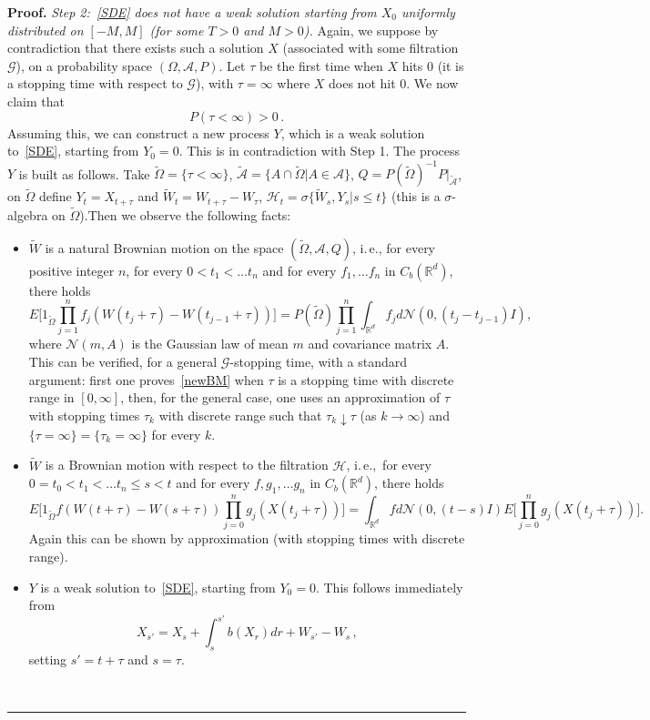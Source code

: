 \documentclass[a4paper,10pt]{article}
\newenvironment{proof}[1][Proof]{\noindent\textbf{#1.} }{\ \rule{0.5em}{0.5em}}
\newcommand{\mr}{\mathbb{R}}
\newcommand{\mc}{\mathcal}
\newcommand{\td}{\tilde}
\begin{document}
\begin{proof}
\emph{Step 2:~\eqref{SDE} does not have a weak solution starting from $X_0$ uniformly distributed on $[-M,M]$ (for some $T>0$ and $M>0$).} Again, we suppose by contradiction that there exists such a solution $X$ (associated with some filtration $\mc{G}$), on a probability space $(\Omega,\mc{A},P)$. Let $\tau$ be the first time when $X$ hits $0$ (it is a stopping time with respect to $\mc{G}$), with $\tau=\infty$ where $X$ does not hit $0$. We now claim that
\begin{equation}
P(\tau<\infty)>0 \, .\label{claim'}
\end{equation}
Assuming this, we can construct a new process $Y$, which is a weak solution to~\eqref{SDE}, starting from $Y_0=0$. This is in contradiction with Step 1. The process $Y$ is built as follows. Take $\td{\Omega}=\{\tau<\infty\}$, $\td{\mc{A}}=\{A\cap\td{\Omega}|A\in\mc{A}\}$, 
$Q= P(\td{\Omega})^{-1} P|_{\td{\mc{A}}}$, on $\td{\Omega}$ define $Y_t=X_{t+\tau}$ and $\td{W}_t=W_{t+\tau}-W_\tau$, $\mc{H}_t=\sigma\{\td{W}_s,Y_s|s\le t\}$ (this is a $\sigma$-algebra on $\td{\Omega}$).Then we observe the following facts:

\begin{itemize}
  \item $\td{W}$ is a natural Brownian motion on the space $(\td{\Omega},\mc{A},Q)$, i.\,e., for every positive integer $n$, for every $0<t_1<\ldots t_n$ and for every $f_1,\ldots f_n$ in $C_b(\mr^d)$, there holds 
  \begin{equation}
  E\Big[1_{\td{\Omega}}\prod^n_{j=1}f_j(W(t_j+\tau)-W(t_{j-1}+\tau))\Big]= P(\td{\Omega})\prod^n_{j=1}\int_{\mr^d}f_jd\mc{N}(0,(t_j-t_{j-1})I),\label{newBM}
  \end{equation}
  where $\mc{N}(m,A)$ is the Gaussian law of mean $m$ and covariance matrix $A$. This can be verified, for a general $\mc{G}$-stopping time, with a standard argument: first one proves~\eqref{newBM} when $\tau$ is a stopping time with discrete range in $[0,\infty]$, then, for the general case, one uses an approximation of $\tau$ with stopping times $\tau_k$ with discrete range such that $\tau_k\downarrow\tau$ (as $k\rightarrow\infty$) and $\{\tau=\infty\}=\{\tau_k=\infty\}$ for every $k$.
  \item $\td{W}$ is a Brownian motion with respect to the filtration $\mc{H}$, i.\,e.,\ for every $0=t_0<t_1<\ldots t_n\le s<t$ and for every $f,g_1,\ldots g_n$ in $C_b(\mr^d)$, there holds 
  \begin{equation*}
  E\Big[1_{\td{\Omega}}f(W(t+\tau)-W(s+\tau))\prod^n_{j=0}g_j(X(t_j+\tau))\Big]= \int_{\mr^d}fd\mc{N}(0,(t-s)I)E\Big[\prod^n_{j=0}g_j(X(t_j+\tau))\Big].
  \end{equation*}
  Again this can be shown by approximation (with stopping times with discrete range).
  \item $Y$ is a weak solution to~\eqref{SDE}, starting from $Y_0 = 0$. This follows immediately from
  \begin{equation*}
  X_{s'}=X_s+\int^{s'}_sb(X_r)dr+W_{s'}-W_s \,,
  \end{equation*}
  setting $s'=t+\tau$ and $s=\tau$.
\end{itemize}


\end{proof}
\end{document}
